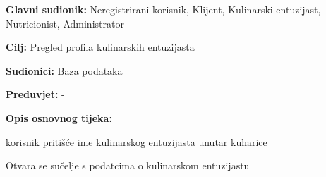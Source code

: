 					\noindent {}
					\begin{packed_item}
	
						\item \textbf{Glavni sudionik: }Neregistrirani korisnik, Klijent, Kulinarski entuzijast, Nutricionist, Administrator
						\item  \textbf{Cilj:} Pregled profila kulinarskih entuzijasta
						\item  \textbf{Sudionici:} Baza podataka
						\item  \textbf{Preduvjet:} -
						\item  \textbf{Opis osnovnog tijeka:} 
						
						\item[] \begin{packed_enum}
	
							\item korisnik pritišće ime kulinarskog entuzijasta unutar kuharice
							\item Otvara se sučelje s podatcima o kulinarskom entuzijastu
						\end{packed_enum}
						

					\end{packed_item}



